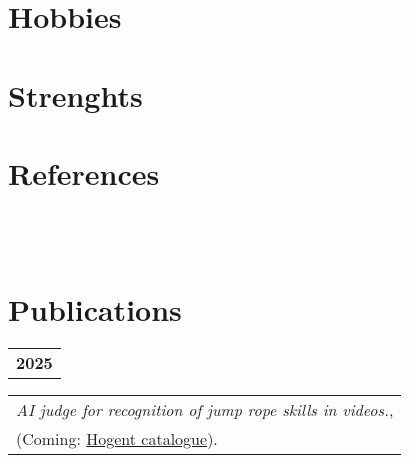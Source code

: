 \documentclass[grey]{hipstercv}
\newlength{\rightcolwidth}
\begin{document}
\begin{paracol}{2}
\begin{minipage}[t]{0.30\rightcolwidth}
\section*{Hobbies}
{\centering {}}
{\centering {}}

\section*{Strenghts}
\end{minipage}\hfill

\vspace{1em}

\begin{minipage}[t]{0.30\rightcolwidth}
\section*{References}
 \\
 \\
\end{minipage}%
\hspace{\fill}%
\begin{minipage}[t]{0.29\rightcolwidth}
\section*{Publications}
\begin{tabular}{@{}>{\footnotesize\bfseries}r @{}}
2025 \\[0.5ex]
\end{tabular}
\begin{tabular}{@{}p{0.29\rightcolwidth}@{}}
\emph{AI judge for recognition of jump rope skills in videos.}, \\
(Coming: \href{https://www.hogent.be/student/bibliotheken/}{Hogent catalogue}). \\
\end{tabular}
\end{minipage}%
\hspace{\fill}%
\begin{minipage}[t]{0.29\rightcolwidth}

\end{minipage}
\end{paracol}
\end{document}
